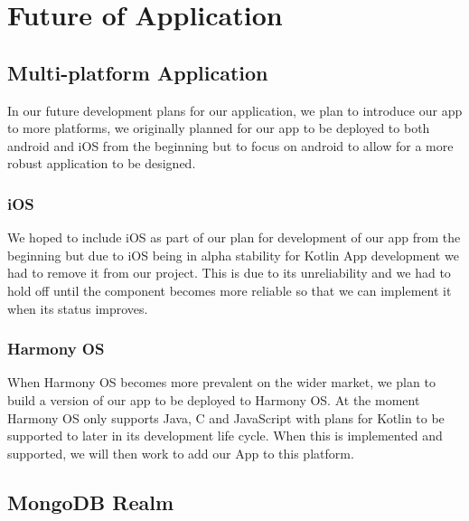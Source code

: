 \section{Future of Application}
\subsection{Multi-platform Application}
In our future development plans for our application, we plan to introduce our app to more platforms, we originally planned for our app to be deployed to both android and iOS from the beginning but to focus on android to allow for a more robust application to be designed.
\subsubsection{iOS}
We hoped to include iOS as part of our plan for development of our app from the beginning but due to iOS being in alpha stability for Kotlin App development\cite{ref2} we had to remove it from our project. This is due to its \newline unreliability and we had to hold off until the component becomes more \newline reliable so that we can implement it when its status improves.
\subsubsection{Harmony OS}
When Harmony OS becomes more prevalent on the wider market, we plan to build a version of our app to be deployed to Harmony OS. At the moment Harmony OS only supports Java, C and JavaScript\cite{ref17} with plans for Kotlin to be supported to later in its development life cycle. When this is implemented and supported, we will then work to add our App to this platform.
\newline
\subsection{MongoDB Realm}
